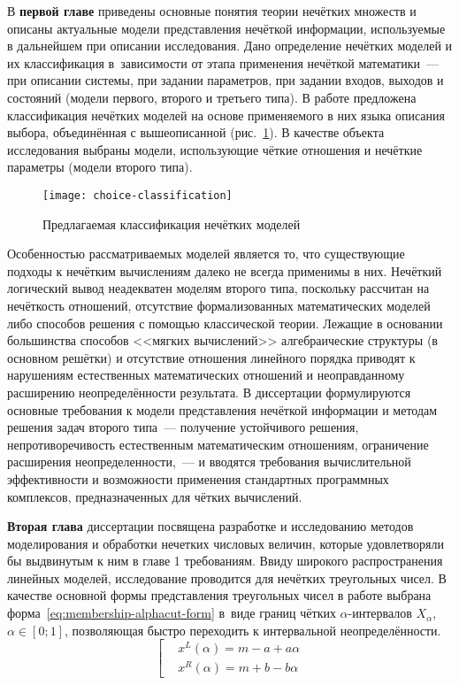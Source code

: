 В \textbf{первой главе} приведены основные понятия теории нечётких множеств и описаны актуальные модели представления нечёткой информации, используемые в дальнейшем при описании исследования. Дано определение нечётких моделей и их классификация в~зависимости от этапа применения нечёткой математики~--- при описании системы, при задании параметров, при задании входов, выходов и состояний (модели первого, второго и третьего типа). В работе предложена классификация нечётких моделей на основе применяемого в них языка описания выбора, объединённая с вышеописанной (рис.~\ref{fig:choice-classification}). В качестве объекта исследования выбраны модели, использующие чёткие отношения и нечёткие параметры (модели второго типа).
\begin{figure}[h] 
  \center
  \texttt{[image: choice-classification]}
  \caption{Предлагаемая классификация нечётких моделей} 
  \label{fig:choice-classification}
\end{figure}

Особенностью рассматриваемых моделей является то, что существующие подходы к нечётким вычислениям далеко не всегда применимы в них. Нечёткий логический вывод неадекватен моделям второго типа, поскольку рассчитан на нечёткость отношений, отсутствие формализованных математических моделей либо способов решения с помощью классической теории. Лежащие в основании большинства способов <<мягких вычислений>> алгебраические структуры (в основном решётки) и отсутствие отношения линейного порядка приводят к нарушениям естественных математических отношений и неоправданному расширению неопределённости результата. В диссертации формулируются основные требования к модели представления нечёткой информации и методам решения задач второго типа~--- получение устойчивого решения, непротиворечивость естественным математическим отношениям, ограничение расширения неопределенности,~--- и вводятся требования вычислительной эффективности и возможности применения стандартных программных комплексов, предназначенных для чётких вычислений.

\textbf{Вторая глава} диссертации посвящена разработке и исследованию методов моделирования и обработки нечетких числовых величин, которые удовлетворяли бы выдвинутым к ним в главе 1 требованиям. Ввиду широкого распространения линейных моделей, исследование проводится для нечётких треугольных чисел. В качестве основной формы представления треугольных чисел в работе выбрана форма~\eqref{eq:membership-alphacut-form} в~виде границ чётких $\alpha$-интервалов $X_\alpha$, $\alpha \in \left[ 0;1 \right]$, позволяющая быстро переходить к интервальной неопределённости.
\begin{equation}
\label{eq:membership-alphacut-form}
	\left[ 
		\begin{aligned}
			& x^L(\alpha )=m-a+a\alpha  \\ 
			& x^R(\alpha )=m+b-b\alpha
		 \end{aligned}
	\right.
\end{equation}

